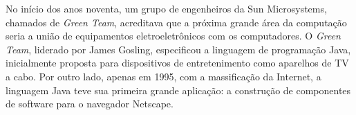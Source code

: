 %
% 



No in\'{i}cio dos anos noventa, um grupo de engenheiros da 
Sun Microsystems, chamados de \textit{Green Team}, acreditava 
que a pr\'{o}xima grande \'{a}rea da computa\c{c}\~{a}o 
seria a uni\~{a}o de equipamentos eletroeletrônicos com os 
computadores. O \textit{Green Team}, liderado por James Gosling, 
especificou a linguagem de programa\c{c}\~{a}o Java, 
inicialmente proposta para dispositivos de entretenimento 
como aparelhos de TV a cabo. Por outro lado, apenas em 1995, 
com a massifica\c{c}\~{a}o da Internet, a linguagem Java 
teve sua primeira grande aplica\c{c}\~{a}o: a constru\c{c}\~{a}o 
de componentes de software para o navegador Netscape.

